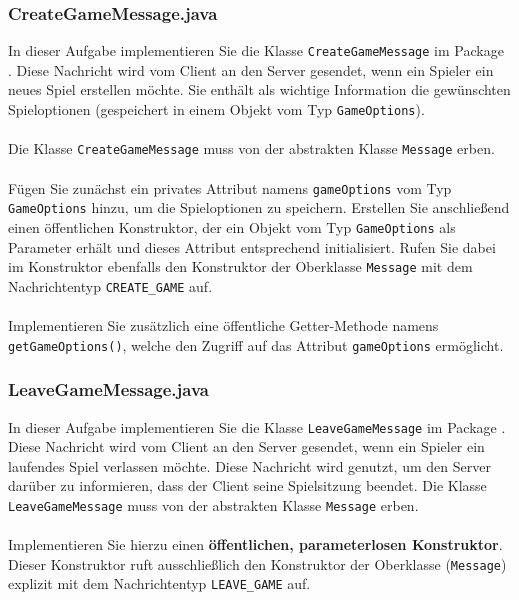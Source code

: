 \documentclass[12pt]{article}
\begin{document}
\subsubsection*{CreateGameMessage.java}

In dieser Aufgabe implementieren Sie die Klasse \texttt{CreateGameMessage} im Package . 
Diese Nachricht wird vom Client an den Server gesendet, wenn ein Spieler ein neues Spiel erstellen möchte. 
Sie enthält als wichtige Information die gewünschten Spieloptionen (gespeichert in einem Objekt vom Typ \texttt{GameOptions}).
\\ \\
Die Klasse \texttt{CreateGameMessage} muss von der abstrakten Klasse \texttt{Message} erben.
\\ \\
Fügen Sie zunächst ein privates Attribut namens \texttt{gameOptions} vom Typ \texttt{GameOptions} hinzu, 
um die Spieloptionen zu speichern. 
Erstellen Sie anschließend einen öffentlichen Konstruktor, der ein Objekt vom Typ \texttt{GameOptions} als Parameter erhält 
und dieses Attribut entsprechend initialisiert. 
Rufen Sie dabei im Konstruktor ebenfalls den Konstruktor der Oberklasse \texttt{Message} 
mit dem Nachrichtentyp \texttt{CREATE\_GAME} auf.
\\ \\
Implementieren Sie zusätzlich eine öffentliche Getter-Methode namens \texttt{getGameOptions()}, 
welche den Zugriff auf das Attribut \texttt{gameOptions} ermöglicht.

\subsubsection*{LeaveGameMessage.java}

In dieser Aufgabe implementieren Sie die Klasse \texttt{LeaveGameMessage} im Package . 
Diese Nachricht wird vom Client an den Server gesendet, wenn ein Spieler ein laufendes Spiel verlassen möchte. 
Diese Nachricht wird genutzt, um den Server darüber zu informieren, dass der Client seine Spielsitzung beendet. 
Die Klasse \texttt{LeaveGameMessage} muss von der abstrakten Klasse \texttt{Message} erben.
\\ \\
Implementieren Sie hierzu einen \textbf{öffentlichen, parameterlosen Konstruktor}. 
Dieser Konstruktor ruft ausschließlich den Konstruktor der Oberklasse (\texttt{Message}) 
explizit mit dem Nachrichtentyp \texttt{LEAVE\_GAME} auf.
\end{document}
